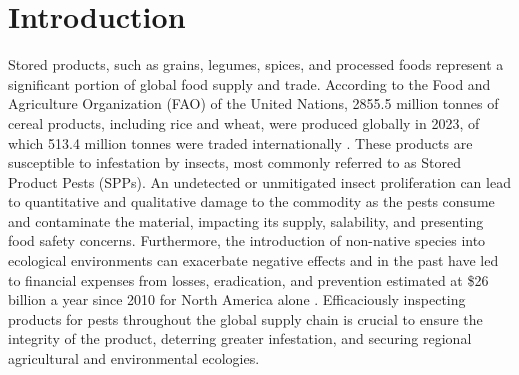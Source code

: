 \chapter{Introduction}

Stored products, such as grains, legumes, spices, and processed foods represent a significant portion of global food supply and trade. According to the Food and Agriculture Organization (FAO) of the United Nations, 2855.5  million tonnes of cereal products, including rice and wheat, were produced globally in 2023, of which 513.4 million tonnes were traded internationally \cite{FoodOutlookBiannual2025}. These products are susceptible to infestation by insects, most commonly referred to as Stored Product Pests (SPPs). An undetected or unmitigated insect proliferation can lead to quantitative and qualitative damage to the commodity as the pests consume and contaminate the material, impacting its supply, salability, and presenting food safety concerns. Furthermore, the introduction of non-native species into ecological environments can exacerbate negative effects and in the past have led to financial expenses from losses, eradication, and prevention estimated at \$26 billion a year since 2010 for North America alone \cite{crystal-ornelasEconomicCostsBiological2021}. Efficaciously inspecting products for pests throughout the global supply chain is crucial to ensure the integrity of the product, deterring greater infestation, and securing regional agricultural and environmental ecologies.

